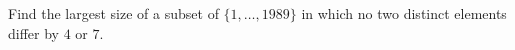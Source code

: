 Find the largest size of a subset of $\{1,\ldots,1989\}$ in which no two distinct elements differ by $4$ or $7$.
